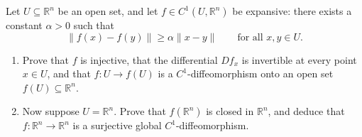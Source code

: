 \begin{exercise}
\label{ex:expansive_local_diffeomorphism_global_inverse}
Let $U \subseteq \mathbb{R}^n$ be an open set, and let $f \in C^1(U, \mathbb{R}^n)$ be expansive:
there exists a constant $\alpha > 0$ such that
\[
\|f(x) - f(y)\| \geq \alpha \|x - y\| \qquad \text{for all } x, y \in U.
\]
\begin{enumerate}[label=\textbf{(\alph*)}]
  \item Prove that $f$ is injective, that the differential $Df_x$ is invertible at every point $x \in U$,
    and that $f : U \to f(U)$ is a $C^1$-diffeomorphism onto an open set $f(U) \subseteq \mathbb{R}^n$.
  \item Now suppose $U = \mathbb{R}^n$. Prove that $f(\mathbb{R}^n)$ is closed in $\mathbb{R}^n$,
    and deduce that $f : \mathbb{R}^n \to \mathbb{R}^n$ is a surjective global $C^1$-diffeomorphism.
\end{enumerate}
\end{exercise}
